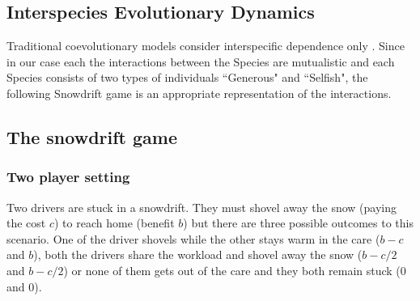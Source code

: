 \documentclass[12pt]{article}
\begin{document}
\renewcommand{\theequation}{A.\arabic{equation}}
\setcounter{equation}{0}

\renewcommand{\thefigure}{A.\arabic{figure}}
\setcounter{figure}{0}

\begin{appendices}

\section{Interspecies Evolutionary Dynamics}

Traditional coevolutionary models consider interspecific dependence only \citep{roughgarden:TPB:1976,roughgarden:book:1983}.
Since in our case each the interactions between the Species are mutualistic and each Species consists of two types of individuals ``Generous" and ``Selfish", the following Snowdrift game is an appropriate representation of the interactions.





\subsection*{The snowdrift game}
\label{appA}
\subsubsection*{Two player setting}
Two drivers are stuck in a snowdrift.
They must shovel away the snow (paying the cost $c$) to reach home (benefit $b$) but there are three possible outcomes to this scenario.
One of the driver shovels while the other stays warm in the care ($b-c$ and $b$), both the drivers share the workload and shovel away the snow ($b-c/2$ and $b-c/2$) or none of them gets out of the care and they both remain stuck ($0$ and $0$).


\end{appendices}
\end{document}
